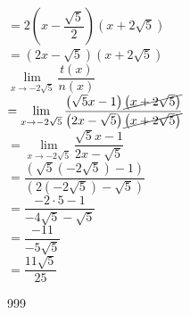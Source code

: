 \documentclass[a4paper]{article}
\newcommand{\llim}{\lim\limits}
\begin{document}
$= 2\left(x-\dfrac{\sqrt{5}}{2}\right)\left(x+ 2\sqrt{5}\right)$ \\

$= \left(2x-\sqrt{5}\right)\left(x+2\sqrt{5}\right)$ \\

$\llim_{x \rightarrow -2\sqrt{5}} \dfrac{t(x)}{n(x)}$ \\

$= \llim_{x \rightarrow -2\sqrt{5}} \dfrac{\left(\sqrt{5}x - 1\right) \cancel{\left(x+2\sqrt{5}\right)}}{\left(2x-\sqrt{5}\right)\cancel{\left(x+2\sqrt{5}\right)}}$ \\

$=\llim_{x \rightarrow -2\sqrt{5}} \dfrac{\sqrt{5}x - 1}{2x-\sqrt{5}}$ \\

$= \dfrac{\left(\sqrt{5}(-2\sqrt{5}) - 1\right)}{\left(2(-2\sqrt{5}) - \sqrt{5}\right)}$ \\

$= \dfrac{-2 \cdot 5 -1}{-4\sqrt{5} - \sqrt{5}}$ \\

$= \dfrac{-11}{-5\sqrt{5}}$ \\

$= \dfrac{11\sqrt5}{25}$\\

\begin{thebibliography}{999}
\end{thebibliography}
\end{document}
